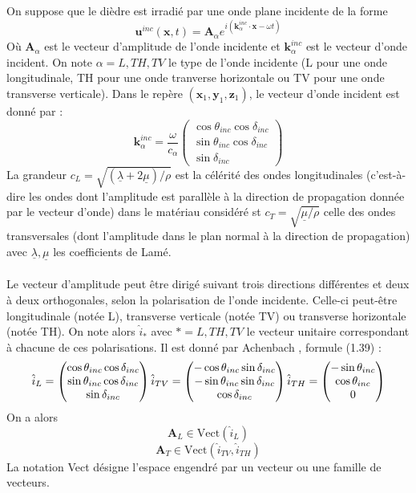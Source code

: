 On suppose que le dièdre est irradié par une onde plane incidente de la forme
$$ \mathbf{u}^{inc}(\mathbf{x},t)=\mathbf{A}_{\alpha}e^{i(\mathbf{k}_{\alpha}^{inc}\cdot \mathbf{x}-\omega t)}$$
Où $\mathbf{A}_{\alpha}$ est le vecteur d'amplitude de l'onde incidente et $\mathbf{k}_{\alpha}^{inc}$ est le vecteur d'onde incident. On note $\alpha=L,TH,TV$ le type de l'onde incidente (L pour une onde longitudinale, TH pour une onde tranverse horizontale ou TV pour une onde transverse verticale). Dans le repère $(\mathbf{x}_1,\mathbf{y}_1, \mathbf{z}_1)$, le vecteur d'onde incident est donné par :
$$\mathbf{k}_{\alpha}^{inc}=\frac{\omega}{c_{\alpha}} \begin{pmatrix}
\cos\theta_{inc} \cos \delta_{inc} \\ \sin\theta_{inc} \cos \delta_{inc} \\
\sin \delta_{inc}
\end{pmatrix} $$
La grandeur $c_L=\sqrt{(\underline{\lambda}+2\underline{\mu})/\rho}$ est la célérité des ondes longitudinales (c'est-à-dire les ondes dont l'amplitude est parallèle à la direction de propagation donnée par le vecteur d'onde) dans le matériau considéré st $c_T=\sqrt{\underline{\mu}/\rho}$ celle des ondes transversales (dont l'amplitude dans le plan normal à la direction de propagation) avec $\underline{\lambda}, \underline{\mu}$ les coefficients de Lamé. 
\paragraph{}
Le vecteur d'amplitude peut être dirigé suivant trois directions différentes et deux à deux orthogonales, selon la polarisation de l'onde incidente. Celle-ci peut-être longitudinale (notée L), transverse verticale (notée TV) ou transverse horizontale (notée TH). On note alors $\hat{i}_*$ avec $*=L, TH, TV$ le vecteur unitaire correspondant à chacune de ces polarisations. Il est donné par Achenbach \cite{Achenbach}, formule (1.39) :
\begin{equation}
\hat{i}_L = \begin{pmatrix}
\cos\theta_{inc} \cos \delta_{inc} \\ \sin\theta_{inc} \cos \delta_{inc} \\
\sin \delta_{inc}
\end{pmatrix}
\hfill
\hfill
\hat{i}_{TV} = \begin{pmatrix}
-\cos\theta_{inc} \sin \delta_{inc} \\ -\sin\theta_{inc} \sin \delta_{inc} \\
\cos \delta_{inc}
\end{pmatrix}
\hfill
\hfill
\hat{i}_{TH} = \begin{pmatrix}
-\sin\theta_{inc} \\ \cos\theta_{inc} \\
0
\end{pmatrix}
\label{ivec}
\end{equation}
On a alors
$$ \mathbf{A}_L \in \mbox{Vect}(\hat{i}_L) $$
$$ \mathbf{A}_T \in \mbox{Vect}(\hat{i}_{TV}, \hat{i}_{TH})$$
La notation Vect désigne l'espace engendré par un vecteur ou une famille de vecteurs.
